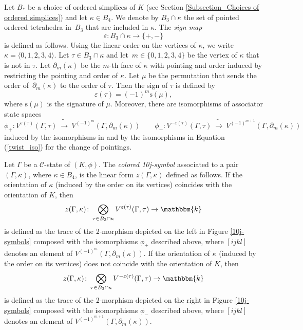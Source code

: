 \documentclass[a4paper, oneside]{amsart}
\numberwithin{equation}{subsection}
\theoremstyle{referencedlemma}
\theoremstyle{plain} %
\theoremstyle{remark}
\begin{document}
Let $B_*$ be a choice of ordered simplices of $K$ (see Section \ref{Subsection_Choices of ordered simplices}) and let $\kappa\in B_4$.   We denote by $B_3\cap \kappa$ the set of pointed ordered tetrahedra in~$B_3$ that are included in $\kappa$.  The \emph{sign map}
$$
\varepsilon\colon B_3\cap \kappa \to \{+, -\}
$$
is defined as follows.  Using the linear order on the vertices of $\kappa$, we write $\kappa = \langle 0,1,2,3,4\rangle$.  Let $\tau \in B_3\cap \kappa$ and let~\mbox{$m \in \{0,1,2,3,4\}$} be the vertex of $\kappa$ that is not in $\tau$.  Let $\partial_m(\kappa)$ be the $m$-th face of $\kappa$ with pointing and order induced by restricting the pointing and order of $\kappa$.  Let $\mu$ be the permutation that sends the order of~$\partial_m(\kappa)$ to the order of $\tau$. Then the sign of $\tau$ is defined by
$$
\varepsilon(\tau) = (-1)^m\mathrm{s}(\mu),
$$
where $\mathrm{s}(\mu)$ is the signature of $\mu$.  Moreover, there are isomorphisms of associator state spaces 
$$
\phi_+ \colon V^{\varepsilon (\tau)}(\Gamma, \tau)\ \tilde{\to}\  V^{(-1)^{m}}(\Gamma, \partial_m(\kappa)) \quad \quad \phi_- \colon V^{-\varepsilon (\tau)}(\Gamma, \tau) \ \tilde{\to}\  V^{(-1)^{m+1}}(\Gamma, \partial_m(\kappa))
$$
induced by the isomorphisms in \cite[Lemma 4.2.4]{douglas_fusion_2018} and by the isomorphisms in Equation (\ref{twist_iso}) for the change of pointings. 

Let $\Gamma$ be a $\mathcal{C}$-state of $(K,\phi)$.  The \emph{colored 10j-symbol} associated to a pair $(\Gamma, \kappa)$, where $\kappa \in B_4$, is the linear form $z(\Gamma, \kappa)$ defined as follows.  If the orientation of $\kappa$ (induced by the order on its vertices) coincides with the orientation of $K$, then
$$
z(\Gamma, \kappa) \colon \bigotimes_{\tau \in B_3\cap \kappa} V^{\varepsilon(\tau)}(\Gamma, \tau) \to \mathbbm{k}
$$
is defined as the trace of the 2-morphism depicted on the left in Figure \ref{10j-symbols} composed with the isomorphisms $\phi_+$ described above, where $[ijkl]$ denotes an element of $V^{(-1)^{m}}(\Gamma, \partial_m(\kappa))$.  If the orientation of $\kappa$ (induced by the order on its vertices) does not coincide with the orientation of $K$, then
$$
z(\Gamma, \kappa) \colon \bigotimes_{\tau \in B_3\cap \kappa} V^{-\varepsilon(\tau)}(\Gamma, \tau) \to \mathbbm{k}
$$
is defined as the trace of the 2-morphism depicted on the right in Figure \ref{10j-symbols} composed with the isomorphisms $\phi_-$ described above, where $[ijkl]$ denotes an element of $V^{(-1)^{m+1}}(\Gamma, \partial_m(\kappa))$. 
\end{document}
